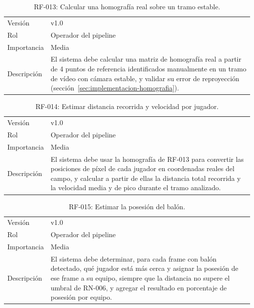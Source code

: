 \begin{table}[htp]
\centering
\caption{RF-013: Calcular una homografía real sobre un tramo estable.}
\label{tab:rf-013}
\renewcommand{\arraystretch}{1.2}
\begin{tabular}{|p{3.1cm}|p{9.2cm}|}
\hline
\rowcolor{gray!25}
\multicolumn{2}{|l|}{\textbf{RF-013 -- Calcular una homografía real sobre un tramo estable}} \\
\hline
Versión & v1.0 \\
\hline
Rol & Operador del pipeline \\
\hline
Importancia & Media \\
\hline
Descripción & El sistema debe calcular una matriz de homografía real a
  partir de 4 puntos de referencia identificados manualmente en un tramo de
  vídeo con cámara estable, y validar su error de reproyección
  (sección~\ref{sec:implementacion-homografia}). \\
\hline
\end{tabular}
\end{table}

\begin{table}[htp]
\centering
\caption{RF-014: Estimar distancia recorrida y velocidad por jugador.}
\label{tab:rf-014}
\renewcommand{\arraystretch}{1.2}
\begin{tabular}{|p{3.1cm}|p{9.2cm}|}
\hline
\rowcolor{gray!25}
\multicolumn{2}{|l|}{\textbf{RF-014 -- Estimar distancia recorrida y velocidad por jugador}} \\
\hline
Versión & v1.0 \\
\hline
Rol & Operador del pipeline \\
\hline
Importancia & Media \\
\hline
Descripción & El sistema debe usar la homografía de RF-013 para convertir
  las posiciones de píxel de cada jugador en coordenadas reales del campo,
  y calcular a partir de ellas la distancia total recorrida y la velocidad
  media y de pico durante el tramo analizado. \\
\hline
\end{tabular}
\end{table}

\begin{table}[htp]
\centering
\caption{RF-015: Estimar la posesión del balón.}
\label{tab:rf-015}
\renewcommand{\arraystretch}{1.2}
\begin{tabular}{|p{3.1cm}|p{9.2cm}|}
\hline
\rowcolor{gray!25}
\multicolumn{2}{|l|}{\textbf{RF-015 -- Estimar la posesión del balón}} \\
\hline
Versión & v1.0 \\
\hline
Rol & Operador del pipeline \\
\hline
Importancia & Media \\
\hline
Descripción & El sistema debe determinar, para cada frame con balón
  detectado, qué jugador está más cerca y asignar la posesión de ese frame
  a su equipo, siempre que la distancia no supere el umbral de RN-006, y
  agregar el resultado en porcentaje de posesión por equipo. \\
\hline
\end{tabular}
\end{table}

